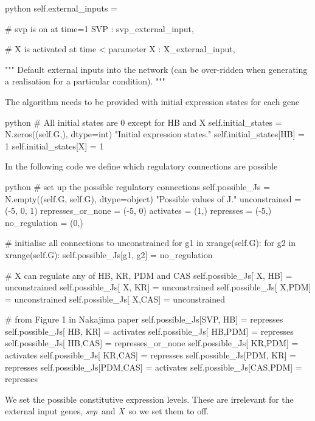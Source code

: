 \documentclass{article}
\newcommand{\svp}{\emph{svp}}
\newcommand{\X}{\emph{X}}
\begin{document}
\begin{pygmented}{python}
        self.external_inputs = {
            # svp is on at time=1
            SVP : svp_external_input,
            
            # X is activated at time < parameter
              X : X_external_input,
        }
        """
        Default external inputs into the network (can be over-ridden
        when generating a realisation for a particular condition).
        """
\end{pygmented}
The algorithm needs to be provided with initial expression states for each gene
\begin{pygmented}{python}
        # All initial states are 0 except for HB and X
        self.initial_states = N.zeros((self.G,), dtype=int)
        "Initial expression states."
        self.initial_states[HB] = 1
        self.initial_states[X] = 1
\end{pygmented}
In the following code we define which regulatory connections are possible
\begin{pygmented}{python}
        # set up the possible regulatory connections
        self.possible_Js = N.empty((self.G, self.G), dtype=object)
        "Possible values of J."        
        unconstrained = (-5, 0, 1)
        represses_or_none = (-5, 0)
        activates = (1,)
        represses = (-5,)
        no_regulation = (0,)
        
        # initialise all connections to unconstrained
        for g1 in xrange(self.G):
            for g2 in xrange(self.G):
                self.possible_Js[g1, g2] = no_regulation
        
        # X can regulate any of HB, KR, PDM and CAS
        self.possible_Js[  X, HB] = unconstrained
        self.possible_Js[  X, KR] = unconstrained
        self.possible_Js[  X,PDM] = unconstrained
        self.possible_Js[  X,CAS] = unconstrained
        
        # from Figure 1 in Nakajima paper
        self.possible_Js[SVP, HB] = represses
        self.possible_Js[ HB, KR] = activates
        self.possible_Js[ HB,PDM] = represses
        self.possible_Js[ HB,CAS] = represses_or_none
        self.possible_Js[ KR,PDM] = activates
        self.possible_Js[ KR,CAS] = represses
        self.possible_Js[PDM, KR] = represses
        self.possible_Js[PDM,CAS] = activates
        self.possible_Js[CAS,PDM] = represses
\end{pygmented}
We set the possible constitutive expression levels. These are irrelevant for the external input genes, \svp\ and \X\ so we set them to off.
\end{document}
